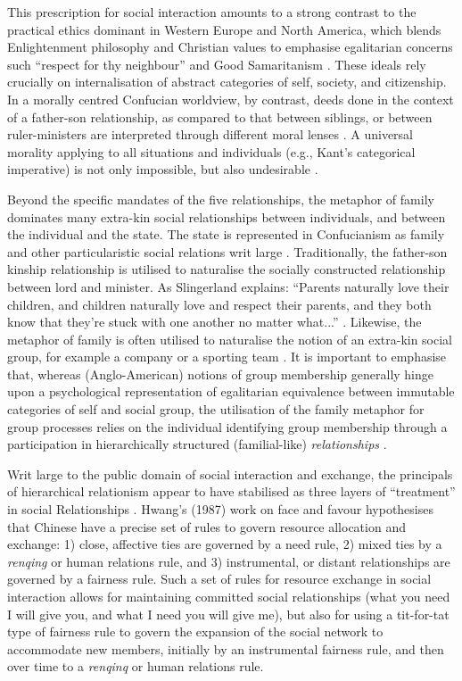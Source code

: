 \begin{CJK}{UTF8}{gbsn}
This prescription for social interaction amounts to a strong contrast to the practical ethics dominant in Western Europe and North America, which blends Enlightenment philosophy and Christian values to emphasise egalitarian concerns such ``respect for thy neighbour'' and Good Samaritanism \citep{Liu2005}.  These ideals rely crucially on internalisation of abstract categories of self, society, and citizenship.  In a morally centred Confucian worldview, by contrast, deeds done in the context of a father-son relationship, as compared to that between siblings, or between ruler-ministers are interpreted through different moral lenses \citep{Liu2011}.  A universal morality applying to all situations and individuals (e.g., Kant’s categorical imperative) is not only impossible, but also undesirable \citep{Bedford2003}.

Beyond the specific mandates of the five relationships, the metaphor of family dominates many extra-kin social relationships between individuals, and between the individual and the state. The state is represented in Confucianism as family and other particularistic social relations writ large \citep[579]{Liu2009}.  Traditionally, the father-son kinship relationship is utilised to naturalise the socially constructed relationship between lord and minister.  As Slingerland explains: ``Parents naturally love their children, and children naturally love and respect their parents, and they both know that they're stuck with one another no matter what...'' \citep[178]{Slingerland2014}. Likewise, the metaphor of family is often utilised to naturalise the notion of an extra-kin social group, for example a company or a sporting team \citep{Brownell2008}.
It is important to emphasise that, whereas (Anglo-American) notions of group membership generally hinge upon a psychological representation of egalitarian equivalence between immutable categories of self and social group, the utilisation of the family metaphor for group processes relies on the individual identifying group membership through a participation in hierarchically structured (familial-like) \textit{relationships} \citep{Fei1992}.

Writ large to the public domain of social interaction and exchange, the principals of hierarchical relationism appear to have stabilised as three layers of ``treatment'' in social Relationships \citep{Liu 2009}.  Hwang’s (1987) work on face and favour hypothesises that Chinese have a precise set of rules to govern resource allocation and exchange: 1) close, affective ties are governed by a need rule, 2) mixed ties by a \textit{renqing} or human relations rule, and 3) instrumental, or distant relationships are governed by a fairness rule.  Such a set of rules for resource exchange in social interaction allows for maintaining committed social relationships (what you need I will give you, and what I need you will give me), but also for using a tit-for-tat type of fairness rule to govern the expansion of the social network to accommodate new members, initially by an instrumental fairness rule, and then over time to a \textit{renqinq} or human relations rule.


\end{CJK}
